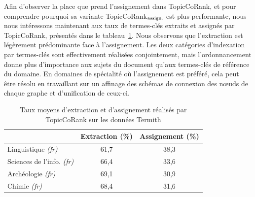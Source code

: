        Afin d'observer la place que prend l'assignement dans TopicCoRank, et
        pour comprendre pourquoi sa variante TopicCoRank$_\textnormal{assign.}$
        est plus performante, nous nous intéressons maintenant aux taux de
        termes-clés extraits et assignés par TopicCoRank, présentés dans le
        tableau~\ref{tab:assignment_ratio_termith}. Nous observons que
        l'extraction est légèrement prédominante face à \mbox{l'assignement}. Les deux
        catégories d'indexation par termes-clés sont effectivement réalisées
        conjointement, mais l'ordonnancement donne plus d'importance aux sujets
        du document qu'aux termes-clés de référence du domaine. En domaines de
        spécialité où l'assignement est préféré, cela peut être résolu en
        travaillant sur un affinage des schémas de connexion des n\oe{}uds de
        chaque graphe et d'unification de ceux-ci.
        \begin{table}
          \centering
          \begin{tabular}{l|c|c}
              \toprule
              & Extraction (\%) & Assignement (\%)\\
              \hline
              Linguistique \textit{(fr)} & 61,7 & 38,3\\
              Sciences de l'info. \textit{(fr)} & 66,4 & 33,6\\
              Archéologie \textit{(fr)} & 69,1 & 30,9\\
              Chimie \textit{(fr)} & 68,4 & 31,6\\
              \bottomrule
          \end{tabular}
          \caption{Taux moyens d'extraction et d'assignement réalisés par
                   TopicCoRank sur les données Termith
                   \label{tab:assignment_ratio_termith}}
        \end{table}

